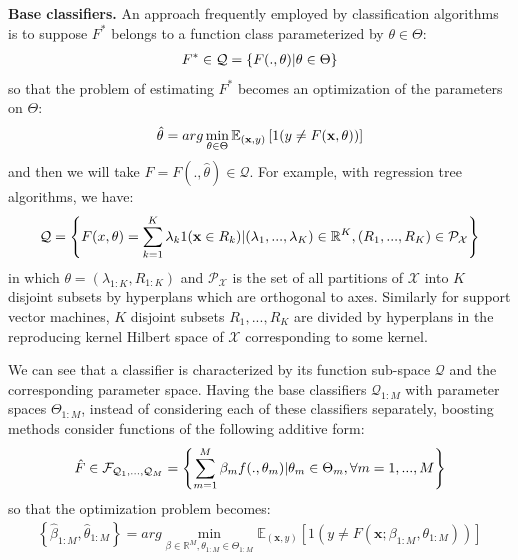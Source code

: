 \documentclass[a4paper,twoside,12pt]{article}
\begin{document}
\textbf{Base classifiers.} An approach frequently employed by classification algorithms is to suppose $F^{*}$ belongs to a function class parameterized by $\theta \in \Theta$:
\begin{align}
    F^{*} \in \mathcal{Q} = \left\lbrace F(., \theta) \vert \theta \in \Theta\right\rbrace \notag
\end{align}
so that the problem of estimating $F^{*}$ becomes an optimization of the parameters on $\Theta$:
\begin{align}
    \hat{\theta} = arg\min\limits_{\theta \in \Theta} \mathbb{E}_{(\textbf{x}, y)} \left[ 1(y \neq F(\textbf{x}, \theta))\right] \notag
\end{align}
and then we will take $\hat{F} = F(., \hat{\theta}) \in \mathcal{Q}$. For example, with regression tree algorithms, we have:
\begin{align}
    \mathcal{Q} = \left\lbrace F(x, \theta) = \sum\limits_{k=1}^K \lambda_k 1(\textbf{x} \in R_k) \vert (\lambda_1,...,\lambda_K) \in \mathbb{R}^K, (R_1,...,R_K) \in \mathcal{P}_{\mathcal{X}}\right\rbrace \notag
\end{align}
in which $\theta = (\lambda_{1:K}, R_{1:K})$ and $\mathcal{P}_{\mathcal{X}}$ is the set of all partitions of $\mathcal{X}$ into $K$ disjoint subsets by hyperplans which are orthogonal to axes. Similarly for support vector machines, $K$ disjoint subsets $R_1,...,R_K$ are divided by hyperplans in the reproducing kernel Hilbert space of $\mathcal{X}$ corresponding to some kernel.

We can see that a classifier is characterized by its function sub-space $\mathcal{Q}$ and the corresponding parameter space. Having the base classifiers $\mathcal{Q}_{1:M}$ with parameter spaces $\Theta_{1:M}$, instead of considering each of these classifiers separately, boosting methods consider functions of the following additive form:
\begin{align}
    \hat{F} \in \mathcal{F}_{\mathcal{Q}_1,...,\mathcal{Q}_M} = \left\lbrace \sum\limits_{m=1}^M \beta_m f(., \theta_m) \vert \theta_m \in \Theta_m, \forall m = 1,...,M\right\rbrace \notag
\end{align}
so that the optimization problem becomes:
\begin{align}
    \left\lbrace \hat{\beta}_{1:M}, \hat{\theta}_{1:M}\right\rbrace = arg\min\limits_{\beta \in \mathbb{R}^M, \theta_{1:M} \in \Theta_{1:M}} \mathbb{E}_{(\textbf{x}, y)} \left[ 1(y \neq F(\textbf{x}; \beta_{1:M}, \theta_{1:M}))\right] \label{opt_add}
\end{align}
\end{document}
